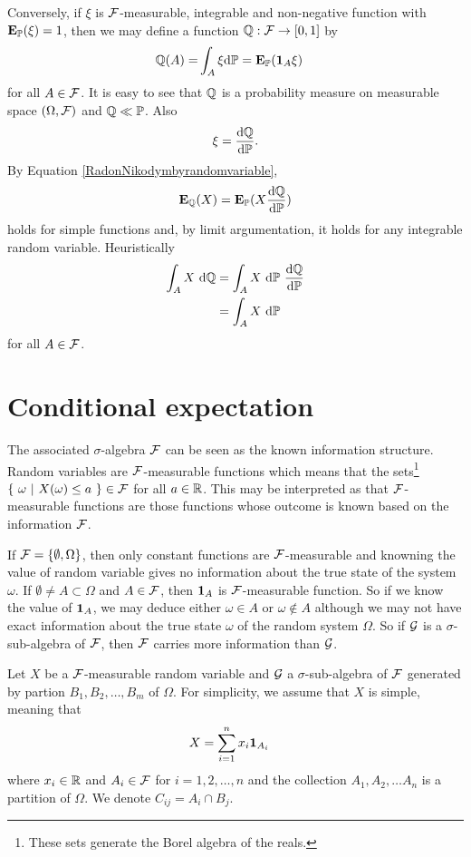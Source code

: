 Conversely, if $\xi$ is $\mathcal{F}$-measurable, integrable and non-negative function with $\operatorname{\boldsymbol{\mathrm{E}}}_{\mathbb{P}} (\xi) = 1$, then we may define a function $\mathbb{Q} : \mathcal{F} \rightarrow [0,1]$ by
\begin{align}
\label{RadonNikodymbyrandomvariable}
\mathbb{Q} ( A ) = &\int_A \xi \mathrm{d} \mathbb{P} = \operatorname{\boldsymbol{\mathrm{E}}}_{\mathbb{P}} ( \boldsymbol{1}_A \xi )
\end{align}
for all $A \in \mathcal{F}$. It is easy to see that $\mathbb{Q}$ is a probability measure on measurable space $(\Omega, \mathcal{F})$ and $\mathbb{Q} \ll \mathbb{P}$. Also
\begin{align}
\xi = \frac{\mathrm{d} \mathbb{Q}}{\mathrm{d} \mathbb{P}} .
\end{align}
By Equation \ref{RadonNikodymbyrandomvariable},
	\begin{align}
		\operatorname{\boldsymbol{\mathrm{E}}}_{\mathbb{Q}} (X) = \operatorname{\boldsymbol{\mathrm{E}}}_{\mathbb{P}} (X \frac{\mathrm{d} \mathbb{Q}}{\mathrm{d} \mathbb{P}} )
	\end{align}
holds for simple functions and, by limit argumentation, it holds for any integrable random variable. Heuristically
	\begin{align}
		 \int_A X \ \mathrm{d} \mathbb{Q} &= \int_A X \ \mathrm{d} \mathbb{P} \ \frac{\mathrm{d} \mathbb{Q}}{\mathrm{d} \mathbb{P}} \\
		 	&= \int_A X \ \mathrm{d} \mathbb{P} 
	\end{align}
for all $A \in \mathcal{F}$.

\section{Conditional expectation}

The associated $\sigma$-algebra $\mathcal{F}$ can be seen as the known information structure. Random variables are $\mathcal{F}$-measurable functions which means that the sets\footnote{These sets generate the Borel algebra of the reals.} $\{ \ \omega \ | \ X(\omega) \leq a \ \} \in \F$ for all $a \in \mathbb{R}$. This may be interpreted as that $\mathcal{F}$-measurable functions are those functions whose outcome is known based on the information $\mathcal{F}$.

If $\mathcal{F} = \{ \emptyset, \Omega \}$, then only constant functions are $\mathcal{F}$-measurable and knowning the value of random variable gives no information about the true state of the system $\omega$. If $\emptyset \not = A \subset \Omega$ and $A \in \mathcal{F}$, then $\boldsymbol{1}_A$ is $\mathcal{F}$-measurable function. So if we know the value of $\boldsymbol{1}_A$, we may deduce either $\omega \in A$ or $\omega \not \in A$ although we may not have exact information about the true state $\omega$ of the random system $\Omega$. So if $\mathcal{G}$ is a $\sigma$-sub-algebra of $\mathcal{F}$, then $\mathcal{F}$ carries more information than $\mathcal{G}$.

Let $X$ be a $\mathcal{F}$-measurable random variable and $\mathcal{G}$ a $\sigma$-sub-algebra of $\mathcal{F}$ generated by partion $B_1, B_2, \ldots, B_m$ of $\Omega$. For simplicity, we assume that $X$ is simple, meaning that
  \begin{align}
    X &= \sum_{i=1}^n x_i \boldsymbol{1}_{A_i}
  \end{align}
where $x_i \in \mathbb{R}$ and $A_i \in \mathcal{F}$ for $i=1,2, \ldots, n$ and the collection $A_1, A_2, \ldots A_n$ is a partition of $\Omega$. We denote $C_{ij} = A_i \cap B_j$.

